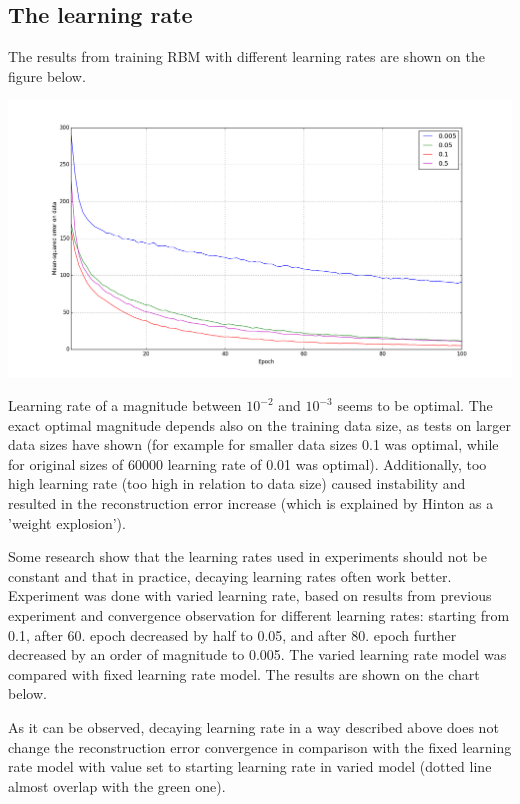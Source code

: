 \documentclass[a4paper]{scrartcl}
\begin{document}
\subsection{The learning rate}
\par The results from training RBM with different learning rates are shown on the figure below.
\begin{center}
\includegraphics[width=16cm]{images/lr.png}
\end{center}
Learning rate of a magnitude between $10^{-2}$ and $10^{-3}$ seems to be optimal. The exact optimal magnitude depends also on the training data size, as tests on larger data sizes have shown (for example for smaller data sizes 0.1 was optimal, while for original sizes of 60000 learning rate of 0.01 was optimal). Additionally, too high learning rate (too high in relation to data size) caused instability and resulted in the reconstruction error increase (which is explained by Hinton \cite{Hinton} as a 'weight explosion'). 
\par Some research \cite{Tieleman} show that the learning rates used in experiments should not be constant and that in practice, decaying learning rates often work better. Experiment was done with varied learning rate, based on results from previous experiment and convergence observation for different learning rates: starting from 0.1, after 60. epoch decreased by half to 0.05, and after 80. epoch further decreased by an order of magnitude to 0.005. The varied learning rate model was compared with fixed learning rate model. The results are shown on the chart below.
\par As it can be observed, decaying learning rate in a way described above does not change the reconstruction error convergence in comparison with the fixed learning rate model with value set to starting learning rate in varied model (dotted line almost overlap with the green one).
\end{document}
